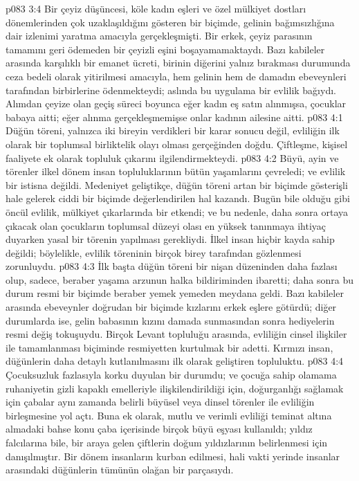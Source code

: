 \vs p083 3:4 Bir çeyiz düşüncesi, köle kadın eşleri ve özel mülkiyet dostları dönemlerinden çok uzaklaşıldığını gösteren bir biçimde, gelinin bağımsızlığına dair izlenimi yaratma amacıyla gerçekleşmişti. Bir erkek, çeyiz parasının tamamını geri ödemeden bir çeyizli eşini boşayamamaktaydı. Bazı kabileler arasında karşılıklı bir emanet ücreti, birinin diğerini yalnız bırakması durumunda ceza bedeli olarak yitirilmesi amacıyla, hem gelinin hem de damadın ebeveynleri tarafından birbirlerine ödenmekteydi; aslında bu uygulama bir evlilik bağıydı. Alımdan çeyize olan geçiş süreci boyunca eğer kadın eş satın alınmışsa, çocuklar babaya aitti; eğer alınma gerçekleşmemişse onlar kadının ailesine aitti.
\vs p083 4:1 Düğün töreni, yalnızca iki bireyin verdikleri bir karar sonucu değil, evliliğin ilk olarak bir toplumsal birliktelik olayı olması gerçeğinden doğdu. Çiftleşme, kişisel faaliyete ek olarak topluluk çıkarını ilgilendirmekteydi.
\vs p083 4:2 Büyü, ayin ve törenler ilkel dönem insan topluluklarının bütün yaşamlarını çevreledi; ve evlilik bir istisna değildi. Medeniyet geliştikçe, düğün töreni artan bir biçimde gösterişli hale gelerek ciddi bir biçimde değerlendirilen hal kazandı. Bugün bile olduğu gibi öncül evlilik, mülkiyet çıkarlarında bir etkendi; ve bu nedenle, daha sonra ortaya çıkacak olan çocukların toplumsal düzeyi olası en yüksek tanınmaya ihtiyaç duyarken yasal bir törenin yapılması gerekliydi. İlkel insan hiçbir kayda sahip değildi; böylelikle, evlilik töreninin birçok birey tarafından gözlenmesi zorunluydu.
\vs p083 4:3 İlk başta düğün töreni bir nişan düzeninden daha fazlası olup, sadece, beraber yaşama arzunun halka bildiriminden ibaretti; daha sonra bu durum resmi bir biçimde beraber yemek yemeden meydana geldi. Bazı kabileler arasında ebeveynler doğrudan bir biçimde kızlarını erkek eşlere götürdü; diğer durumlarda ise, gelin babasının kızını damada sunmasından sonra hediyelerin resmi değiş tokuşuydu. Birçok Levant topluluğu arasında, evliliğin cinsel ilişkiler ile tamamlanması biçiminde resmiyetten kurtulmak bir adetti. Kırmızı insan, düğünlerin daha detaylı kutlanılmasını ilk olarak geliştiren topluluktu.
\vs p083 4:4 Çocuksuzluk fazlasıyla korku duyulan bir durumdu; ve çocuğa sahip olamama ruhaniyetin gizli kapaklı emelleriyle ilişkilendirildiği için, doğurganlığı sağlamak için çabalar aynı zamanda belirli büyüsel veya dinsel törenler ile evliliğin birleşmesine yol açtı. Buna ek olarak, mutlu ve verimli evliliği teminat altına almadaki bahse konu çaba içerisinde birçok büyü eşyası kullanıldı; yıldız falcılarına bile, bir araya gelen çiftlerin doğum yıldızlarının belirlenmesi için danışılmıştır. Bir dönem insanların kurban edilmesi, hali vakti yerinde insanlar arasındaki düğünlerin tümünün olağan bir parçasıydı.
